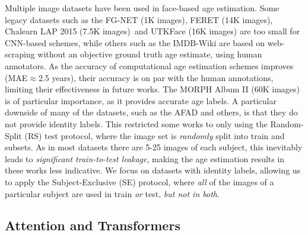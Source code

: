 \documentclass[10pt,journal]{IEEEtran}\usepackage{amsfonts}
\begin{document}
Multiple image datasets have been used in face-based age estimation. Some
legacy datasets such as the FG-NET \cite{cootes2008fg} (1K images), FERET
\cite{PHILLIPS1998295} (14K images), Chalearn LAP 2015
\cite{agustsson2017appareal} (7.5K images)\ and UTKFace \cite{zhifei2017cvpr}
(16K images) are too small for CNN-based schemes, while others such as the
IMDB-Wiki \cite{7406390} are based on web-scraping without an objective ground
truth age estimate, using human annotators. As the accuracy of computational
age estimation schemes improves (MAE$\approx$2.5 years), their accuracy is on
par with the human annotations, limiting their effectiveness in future works.
The MORPH Album II \cite{1613043} (60K images) is of particular importance, as
it provides accurate age labels. A particular downside of many of the
datasets, such as the AFAD \cite{7780901} and others, is that they do not
provide identity labels. This restricted some works to only using the
Random-Split (RS) test protocol, where the image set is \textit{randomly}
split into train and subsets. As in most datasets there are 5-25 images of
each subject, this inevitably leads to \textit{significant train-to-test
leakage}, making the age estimation results in these works less indicative. We
focus on datasets with identity labels, allowing us to apply the
Subject-Exclusive (SE) protocol, where \textit{all} of the images of a
particular subject are used in train \textit{or} test, \textit{but not in
both}.

\subsection{Attention and Transformers}
\end{document}

